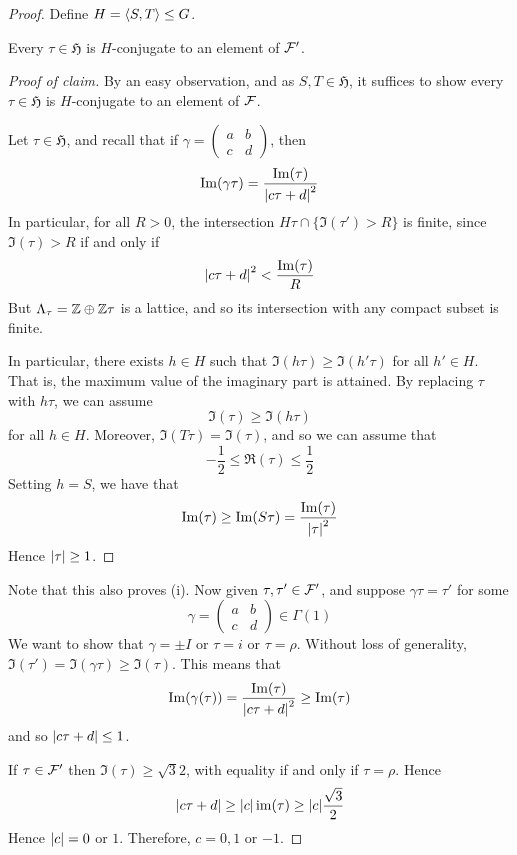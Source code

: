 \documentclass{article}
\newcommand{\mfH}{\mathfrak{H}}
\begin{document}
\begin{proof}
    Define \(H = \left\langle S, T \right\rangle \le G\).
    \begin{claim}
        Every \(\tau \in \mfH\) is \(H\)-conjugate to an element of \(\mathcal{F}'\).
    \end{claim}
    \begin{proof}
        [Proof of claim] By an easy observation, and as \(S, T \in \mfH\), it suffices to show every \(\tau \in \mfH\) is \(H\)-conjugate to an element of \(\mathcal{F}\).

        Let \(\tau \in \mfH\), and recall that if \(\gamma = \begin{pmatrix}
            a & b \\ c & d
        \end{pmatrix}\), then
        \[\Im(\gamma\tau) = \frac{\Im(\tau)}{\abs{c\tau + d}^2}\]
        In particular, for all \(R > 0\), the intersection \(H\tau \cap \{\Im(\tau') > R\}\) is finite, since \(\Im(\tau) > R\) if and only if
        \[\abs{c \tau + d}^2 < \frac{\Im(\tau)}{R}\]
        But \(\Lambda_\tau = \mathbb{Z} \oplus \mathbb{Z}\tau\) is a lattice, and so its intersection with any compact subset is finite.

        In particular, there exists \(h \in H\) such that \(\Im(h\tau) \ge \Im(h'\tau)\) for all \(h' \in H\). That is, the maximum value of the imaginary part is attained. By replacing \(\tau\) with \(h\tau\), we can assume
        \[\Im(\tau) \ge \Im(h\tau)\]
        for all \(h \in H\). Moreover, \(\Im(T\tau) = \Im(\tau)\), and so we can assume that
        \[-\frac{1}{2} \le \Re(\tau) \le \frac{1}{2}\]
        Setting \(h = S\), we have that
        \[\Im(\tau)\ge \Im(S\tau) = \frac{\Im(\tau)}{\abs{\tau}^2}\]
        Hence \(\abs{\tau} \ge 1\).
    \end{proof}
    Note that this also proves (i). Now given \(\tau, \tau' \in \mathcal{F}'\), and suppose \(\gamma\tau = \tau'\) for some
    \[\gamma = \begin{pmatrix}
        a & b \\ c & d
    \end{pmatrix} \in \Gamma(1)\]
    We want to show that \(\gamma = \pm I\) or \(\tau = i\) or \(\tau = \rho\). Without loss of generality, \(\Im(\tau') = \Im(\gamma\tau) \ge \Im(\tau)\). This means that
    \[\Im(\gamma(\tau)) = \frac{\Im(\tau)}{\abs{c\tau + d}^2} \ge \Im(\tau)\]
    and so \(\abs{c\tau + d} \le 1\).

    If \(\tau \in \mathcal{F}'\) then \(\Im(\tau) \ge \sqrt{3}{2}\), with equality if and only if \(\tau = \rho\). Hence
    \[\abs{c\tau + d} \ge \abs{c}\operatorname{im}(\tau) \ge \abs{c}\frac{\sqrt{3}}{2}\]
    Hence \(\abs{c} = 0\) or \(1\). Therefore, \(c = 0, 1\) or \(-1\).


\end{proof}
\end{document}

